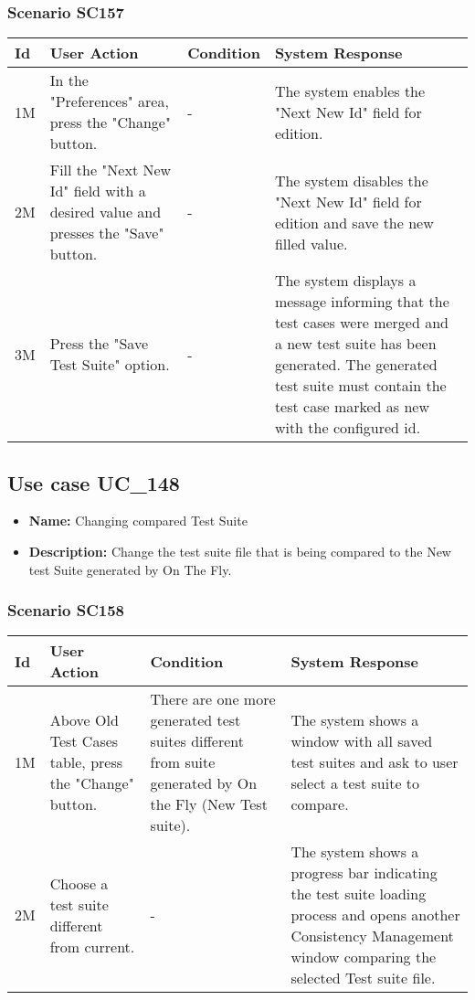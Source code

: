 \documentclass[a4paper,11pt]{article}
\newcommand{\bl}{\\ \hline}
\begin{document}
\subsubsection*{Scenario SC157}
\begin{tabular}{|p{0.4in}|p{1.5in}|p{1.5in}|p{1.5in}|}
\hline
Id & User Action & Condition & System Response \bl 
1M & In the "Preferences" area, press the "Change" button.
					 & - & The system enables the "Next New Id" field for edition.
					\bl
2M & Fill the "Next New Id" field with a desired value and
						presses the "Save" button. & - & The system disables the "Next New Id" field for edition
						and save the new filled value.\bl
3M & Press the "Save Test Suite" option. & - & The system displays a message informing that the test
						cases were merged and a new test suite has been generated. The
						generated test suite must contain the test case marked as new with
						the configured id. \bl
\end{tabular}
\subsection*{Use case UC_148}
\begin{itemize}
\item {\bf Name: }Changing compared Test Suite
\item {\bf Description: }Change the test suite file that is being compared to the
				New test Suite generated by On The Fly.
\end{itemize}
\subsubsection*{Scenario SC158}
\begin{tabular}{|p{0.4in}|p{1.5in}|p{1.5in}|p{1.5in}|}
\hline
Id & User Action & Condition & System Response \bl 
1M & Above Old Test Cases table, press the "Change" button.
					 & There are one more generated test suites different from
						suite generated by On the Fly (New Test suite). & The system shows a window with all saved test suites and
						ask to user select a test suite to compare.\bl
2M & Choose a test suite different from current. & - & The system shows a progress bar indicating the test suite
						loading process and opens another Consistency Management window
						comparing the selected Test suite file.\bl
\end{tabular}
\end{document}
